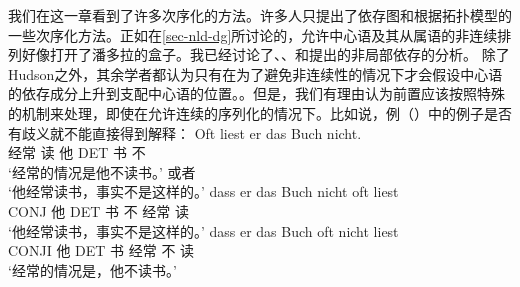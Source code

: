 我们在这一章看到了许多次序化的方法。许多人只提出了依存图和根据拓扑模型的一些次序化方法。正如在\ref{sec-nld-dg}所讨论的，允许中心语及其从属语的非连续排列好像打开了潘多拉的盒子。我已经讨论了\citet{Kunze68a-u}、\citet{Hudson97a,Hudson2000a}、\citet*{KNR98a}和\citet{GO2009a}提出的非局部依存的分析。
除了Hudson之外，其余学者都认为只有在为了避免非连续性的情况下才会假设中心语的依存成分上升到支配中心语的位置。。但是，我们有理由认为前置应该按照特殊的机制来处理，即使在允许连续的序列化的情况下。比如说，例（）中的例子是否有歧义就不能直接得到解释：
\eal
\ex\label{ex-oft-liest-er-das-buch-nicht} 
\gll Oft liest er das Buch nicht.\\
     经常 读 他 DET  书 不\\
\glt `经常的情况是他不读书。' 或者\\
     `他经常读书，事实不是这样的。'
\ex
\gll dass er das Buch nicht oft liest\\
      CONJ 他 DET 书 不 经常 读\\
\glt `他经常读书，事实不是这样的。'
\ex
\gll dass er das Buch oft nicht liest\\
     CONJI 他 DET 书 经常 不 读\\
\glt `经常的情况是，他不读书。'
